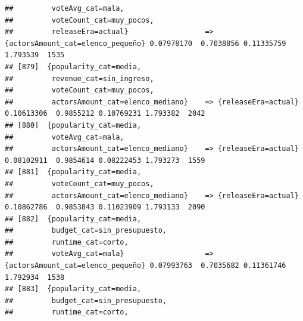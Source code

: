 \documentclass[
]{article}
\begin{document}
\begin{verbatim}
##         voteAvg_cat=mala,                                                                                                       
##         voteCount_cat=muy_pocos,                                                                                                
##         releaseEra=actual}                  => {actorsAmount_cat=elenco_pequeño} 0.07978170  0.7038056 0.11335759 1.793539  1535
## [879]  {popularity_cat=media,                                                                                                   
##         revenue_cat=sin_ingreso,                                                                                                
##         voteCount_cat=muy_pocos,                                                                                                
##         actorsAmount_cat=elenco_mediano}    => {releaseEra=actual}               0.10613306  0.9855212 0.10769231 1.793382  2042
## [880]  {popularity_cat=media,                                                                                                   
##         voteAvg_cat=mala,                                                                                                       
##         actorsAmount_cat=elenco_mediano}    => {releaseEra=actual}               0.08102911  0.9854614 0.08222453 1.793273  1559
## [881]  {popularity_cat=media,                                                                                                   
##         voteCount_cat=muy_pocos,                                                                                                
##         actorsAmount_cat=elenco_mediano}    => {releaseEra=actual}               0.10862786  0.9853843 0.11023909 1.793133  2090
## [882]  {popularity_cat=media,                                                                                                   
##         budget_cat=sin_presupuesto,                                                                                             
##         runtime_cat=corto,                                                                                                      
##         voteAvg_cat=mala}                   => {actorsAmount_cat=elenco_pequeño} 0.07993763  0.7035682 0.11361746 1.792934  1538
## [883]  {popularity_cat=media,                                                                                                   
##         budget_cat=sin_presupuesto,                                                                                             
##         runtime_cat=corto,                                                                                                      

\end{verbatim}
\end{document}
